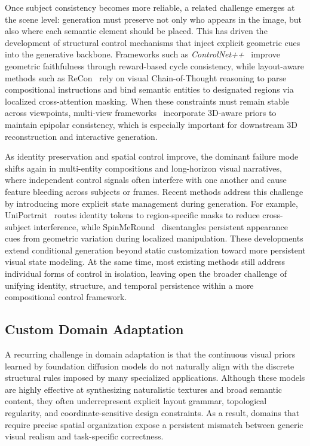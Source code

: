 \documentclass{llmxive}
\begin{document}
Once subject consistency becomes more reliable, a related challenge emerges at the scene level: generation must preserve not only who appears in the image, but also where each semantic element should be placed. This has driven the development of structural control mechanisms that inject explicit geometric cues into the generative backbone. Frameworks such as \textit{ControlNet++}~\citep{controlnet++} improve geometric faithfulness through reward-based cycle consistency, while layout-aware methods such as ReCon~\citep{ReCon} rely on visual Chain-of-Thought reasoning to parse compositional instructions and bind semantic entities to designated regions via localized cross-attention masking. When these constraints must remain stable across viewpoints, multi-view frameworks~\citep{FlexGen, PRISM} incorporate 3D-aware priors to maintain epipolar consistency, which is especially important for downstream 3D reconstruction and interactive generation.


As identity preservation and spatial control improve, the dominant failure mode shifts again in multi-entity compositions and long-horizon visual narratives, where independent control signals often interfere with one another and cause feature bleeding across subjects or frames. Recent methods address this challenge by introducing more explicit state management during generation. For example, UniPortrait~\citep{UniPortrait} routes identity tokens to region-specific masks to reduce cross-subject interference, while SpinMeRound~\citep{SpinMeRound} disentangles persistent appearance cues from geometric variation during localized manipulation. These developments extend conditional generation beyond static customization toward more persistent visual state modeling. At the same time, most existing methods still address individual forms of control in isolation, leaving open the broader challenge of unifying identity, structure, and temporal persistence within a more compositional control framework.



\subsection{Custom Domain Adaptation}

\label{subsec:custom_domain}



A recurring challenge in domain adaptation is that the continuous visual priors learned by foundation diffusion models do not naturally align with the discrete structural rules imposed by many specialized applications. Although these models are highly effective at synthesizing naturalistic textures and broad semantic content, they often underrepresent explicit layout grammar, topological regularity, and coordinate-sensitive design constraints. As a result, domains that require precise spatial organization expose a persistent mismatch between generic visual realism and task-specific correctness.
\end{document}
